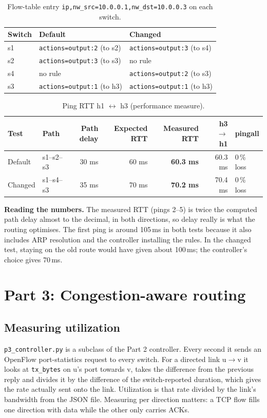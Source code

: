 \documentclass[11pt]{article}
\begin{document}
\begin{table}[H]
\centering
\caption{Flow-table entry \texttt{ip,nw\_src=10.0.0.1,nw\_dst=10.0.0.3} on each switch.}
\label{tab:p2flows}
\begin{tabular}{lll}
\toprule
Switch & Default & Changed \\
\midrule
s1 & \texttt{actions=output:2} (to s2) & \texttt{actions=output:3} (to s4) \\
s2 & \texttt{actions=output:3} (to s3) & no rule \\
s4 & no rule & \texttt{actions=output:2} (to s3) \\
s3 & \texttt{actions=output:1} (to h3) & \texttt{actions=output:1} (to h3) \\
\bottomrule
\end{tabular}
\end{table}

\begin{table}[H]
\centering
\caption{Ping RTT h1 $\leftrightarrow$ h3 (performance measure).}
\begin{tabular}{llrrrrl}
\toprule
Test & Path & Path delay & Expected RTT & Measured RTT & h3 $\to$ h1 & pingall \\
\midrule
Default & s1--s2--s3 & 30 ms & 60 ms & \textbf{60.3 ms} & 60.3 ms & 0\,\% loss \\
Changed & s1--s4--s3 & 35 ms & 70 ms & \textbf{70.2 ms} & 70.4 ms & 0\,\% loss \\
\bottomrule
\end{tabular}
\end{table}

\textbf{Reading the numbers.} The measured RTT (pings 2--5) is twice the computed path delay almost to
the decimal, in both directions, so delay really is what the routing optimises. The first ping is
around 105\,ms in both tests because it also includes ARP resolution and the controller installing
the rules. In the changed test, staying on the old route would have given about 100\,ms; the
controller's choice gives 70\,ms.

\section{Part 3: Congestion-aware routing}

\subsection{Measuring utilization}
\texttt{p3\_controller.py} is a subclass of the Part 2 controller. Every second it sends an OpenFlow
port-statistics request to every switch. For a directed link u$\to$v it looks at \texttt{tx\_bytes} on
u's port towards v, takes the difference from the previous reply and divides it by the difference of
the switch-reported duration, which gives the rate actually sent onto the link. Utilization is that
rate divided by the link's bandwidth from the JSON file. Measuring per direction matters: a TCP flow
fills one direction with data while the other only carries ACKs.
\end{document}
